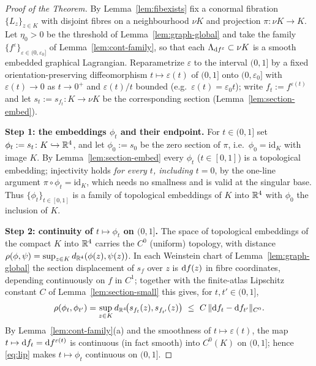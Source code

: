 \begin{proof}[Proof of the Theorem]
By Lemma~\ref{lem:fibexists} fix a conormal fibration $\{L_z\}_{z\in K}$ with
disjoint fibres on a neighbourhood $\nu K$ and projection $\pi\colon\nu K\to K$.
Let $\eta_0>0$ be the threshold of Lemma~\ref{lem:graph-global} and take the
family $\{f^\varepsilon\}_{\varepsilon\in(0,\varepsilon_0]}$ of
Lemma~\ref{lem:cont-family}, so that each $\Lambda_{\mathrm d f^\varepsilon}\subset\nu K$
is a smooth embedded graphical Lagrangian. Reparametrize $\varepsilon$ to the
interval $(0,1]$ by a fixed orientation-preserving diffeomorphism
$t\mapsto\varepsilon(t)$ of $(0,1]$ onto $(0,\varepsilon_0]$ with
$\varepsilon(t)\to0$ as $t\to0^+$ and $\varepsilon(t)/t$ bounded (e.g.\
$\varepsilon(t)=\varepsilon_0 t$); write $f_t:=f^{\varepsilon(t)}$ and let
$s_t:=s_{f_t}\colon K\to\nu K$ be the corresponding section
(Lemma~\ref{lem:section-embed}).

\medskip
\noindent\textbf{Step 1: the embeddings $\phi_t$ and their endpoint.}
For $t\in(0,1]$ set $\phi_t:=s_t\colon K\hookrightarrow\mathbb{R}^4$, and let
$\phi_0:=s_0$ be the zero section of $\pi$, i.e.\ $\phi_0=\mathrm{id}_K$ with image
$K$. By Lemma~\ref{lem:section-embed} every $\phi_t$ ($t\in[0,1]$) is a
topological embedding; injectivity holds \emph{for every $t$, including $t=0$}, by
the one-line argument $\pi\circ\phi_t=\mathrm{id}_K$, which needs no smallness and
is valid at the singular base. Thus $\{\phi_t\}_{t\in[0,1]}$ is a family of
topological embeddings of $K$ into $\mathbb{R}^4$ with $\phi_0$ the inclusion of $K$.

\medskip
\noindent\textbf{Step 2: continuity of $t\mapsto\phi_t$ on $(0,1]$.}
The space of topological embeddings of the compact $K$ into $\mathbb{R}^4$ carries the
$C^0$ (uniform) topology, with distance
$\rho(\phi,\psi)=\sup_{z\in K}d_{\mathbb{R}^4}(\phi(z),\psi(z))$. In each Weinstein chart
of Lemma~\ref{lem:graph-global} the section displacement of $s_{f}$ over $z$ is
$\mathrm d f(z)$ in fibre coordinates, depending continuously on $f$ in $C^1$; together
with the finite-atlas Lipschitz constant $C$ of Lemma~\ref{lem:section-small} this
gives, for $t,t'\in(0,1]$,
\begin{equation}\label{eq:lip}
\rho(\phi_t,\phi_{t'})
=\sup_{z\in K}d_{\mathbb{R}^4}\!\bigl(s_{f_t}(z),s_{f_{t'}}(z)\bigr)
\ \le\ C\,\|\mathrm d f_t-\mathrm d f_{t'}\|_{C^0}.
\end{equation}
By Lemma~\ref{lem:cont-family}(a) and the smoothness of $t\mapsto\varepsilon(t)$,
the map $t\mapsto\mathrm d f_t=\mathrm d f^{\varepsilon(t)}$ is continuous (in fact smooth)
into $C^0(K)$ on $(0,1]$; hence \eqref{eq:lip} makes $t\mapsto\phi_t$ continuous on
$(0,1]$.


\end{proof}
